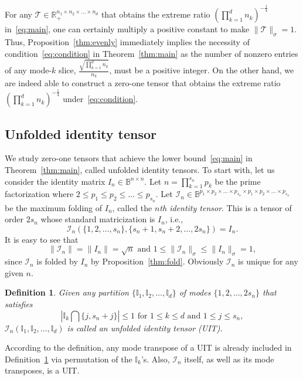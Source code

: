 \documentclass[11pt]{article}
\newtheorem{definition}[theorem]{Definition}
\newcommand{\BB}{\mathbb{B}}
\newcommand{\R}{\mathbb{R}}
\newcommand{\BI}{\mathbb{I}}
\newcommand{\II}{\mathcal{I}}
\newcommand{\TT}{\mathcal{T}}
\begin{document}
For any $\TT\in\R_+^{n_1\times n_2\times \dots\times n_d}$ that obtains the extreme ratio $\left(\prod_{k=1}^dn_k\right)^{-\frac{1}{4}}$ in~\eqref{eq:main}, one can certainly multiply a positive constant to make $\|\TT\|_\sigma=1$. Thus, Proposition~\ref{thm:evenly} immediately implies the necessity of condition~\eqref{eq:condition} in Theorem~\ref{thm:main} as the number of nonzero entries of any mode-$k$ slice, $\frac{\sqrt{\prod_{k=1}^dn_k}}{n_k}$, must be a positive integer. On the other hand, we are indeed able to construct a zero-one tensor that obtains the extreme ratio $\left(\prod_{k=1}^dn_k\right)^{-\frac{1}{4}}$ under~\eqref{eq:condition}.

\subsection{Unfolded identity tensor}\label{sec:sit}

We study zero-one tensors that achieve the lower bound~\eqref{eq:main} in Theorem~\ref{thm:main}, called unfolded identity tensors. To start with, let us consider the identity matrix $I_n\in\BB^{n\times n}$. Let $n=\prod_{k=1}^{s_n} p_k$ be the prime factorization where $2\le p_1\le p_2\le \dots \le p_{s_n}$. Let $\II_n\in\BB^{p_1\times p_2\times \dots \times p_{s_n}\times p_1 \times p_2\times\dots\times p_{s_n}}$ be the maximum folding of $I_n$, called the {\em $n$th identity tensor}. This is a tensor of order $2s_n$ whose standard matricization is $I_n$, i.e.,
$$
\II_n\left(\{1,2,\dots,s_n\},\{s_n+1,s_n+2,\dots,2s_n\}\right)=I_n.
$$
It is easy to see that
$$
\|\II_n\|=\|I_n\|=\sqrt{n} \mbox{ and } 1\le\|\II_n\|_\sigma\le\|I_n\|_\sigma=1,
$$
since $\II_n$ is folded by $I_n$ by Proposition~\ref{thm:fold}. Obviously $\II_n$ is unique for any given $n$. %

\begin{definition} \label{def:uit}
Given any partition $\{\BI_1, \BI_2,\dots, \BI_d\}$ of modes $\{1,2,\dots,2s_n\}$ that satisfies
\begin{equation}\label{eq:condition2}
    \left|\BI_k\bigcap\{j,s_n+j\}\right|\le1 \mbox{ for } 1\le k\le d \mbox{ and } 1\le j\le s_n,
\end{equation}
$\II_n(\BI_1, \BI_2,\dots, \BI_d)$ is called an unfolded identity tensor (UIT).
\end{definition}
According to the definition, any mode transpose of a UIT is already included in Definition~\ref{def:uit} via permutation of the $\BI_k$'s. Also, $\II_n$ itself, as well as its mode transposes, is a UIT.
\end{document}
